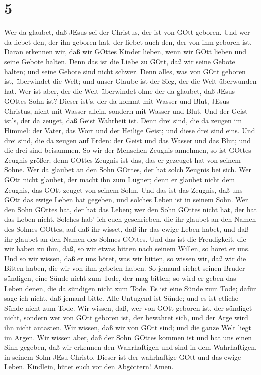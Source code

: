 \hypertarget{section-4}{%
\section{5}\label{section-4}}

 Wer da glaubet, daß JEsus sei der Christus, der ist von
GOtt geboren. Und wer da liebet den, der ihn geboren hat, der liebet
auch den, der von ihm geboren ist.  Daran erkennen wir, daß
wir GOttes Kinder lieben, wenn wir GOtt lieben und seine Gebote halten.
 Denn das ist die Liebe zu GOtt, daß wir seine Gebote
halten; und seine Gebote sind nicht schwer.  Denn alles, was
von GOtt geboren ist, überwindet die Welt; und unser Glaube ist der
Sieg, der die Welt überwunden hat.  Wer ist aber, der die
Welt überwindet ohne der da glaubet, daß JEsus GOttes Sohn ist?
 Dieser ist's, der da kommt mit Wasser und Blut, JEsus
Christus, nicht mit Wasser allein, sondern mit Wasser und Blut. Und der
Geist ist's, der da zeuget, daß Geist Wahrheit ist.  Denn
drei sind, die da zeugen im Himmel: der Vater, das Wort und der Heilige
Geist; und diese drei sind eins.  Und drei sind, die da
zeugen auf Erden: der Geist und das Wasser und das Blut; und die drei
sind beisammen.  So wir der Menschen Zeugnis annehmen, so
ist GOttes Zeugnis größer; denn GOttes Zeugnis ist das, das er gezeuget
hat von seinem Sohne.  Wer da glaubet an den Sohn GOttes,
der hat solch Zeugnis bei sich. Wer GOtt nicht glaubet, der macht ihn
zum Lügner; denn er glaubet nicht dem Zeugnis, das GOtt zeuget von
seinem Sohn.  Und das ist das Zeugnis, daß uns GOtt das
ewige Leben hat gegeben, und solches Leben ist in seinem Sohn.
 Wer den Sohn GOttes hat, der hat das Leben; wer den Sohn
GOttes nicht hat, der hat das Leben nicht.  Solches hab'
ich euch geschrieben, die ihr glaubet an den Namen des Sohnes GOttes,
auf daß ihr wisset, daß ihr das ewige Leben habet, und daß ihr glaubet
an den Namen des Sohnes GOttes.  Und das ist die
Freudigkeit, die wir haben zu ihm, daß, so wir etwas bitten nach seinem
Willen, so höret er uns.  Und so wir wissen, daß er uns
höret, was wir bitten, so wissen wir, daß wir die Bitten haben, die wir
von ihm gebeten haben.  So jemand siehet seinen Bruder
sündigen, eine Sünde nicht zum Tode, der mag bitten; so wird er geben
das Leben denen, die da sündigen nicht zum Tode. Es ist eine Sünde zum
Tode; dafür sage ich nicht, daß jemand bitte.  Alle
Untugend ist Sünde; und es ist etliche Sünde nicht zum Tode.
 Wir wissen, daß, wer von GOtt geboren ist, der sündiget
nicht, sondern wer von GOtt geboren ist, der bewahret sich, und der Arge
wird ihn nicht antasten.  Wir wissen, daß wir von GOtt
sind; und die ganze Welt liegt im Argen.  Wir wissen aber,
daß der Sohn GOttes kommen ist und hat uns einen Sinn gegeben, daß wir
erkennen den Wahrhaftigen und sind in dem Wahrhaftigen, in seinem Sohn
JEsu Christo. Dieser ist der wahrhaftige GOtt und das ewige Leben.
 Kindlein, hütet euch vor den Abgöttern! Amen.

